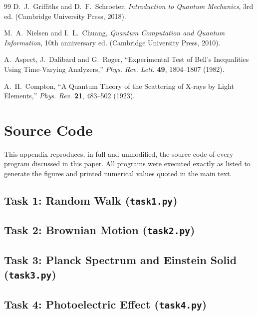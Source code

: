 \documentclass[11pt]{article}
\begin{document}
\begin{thebibliography}{99}
 D.~J.~Griffiths and D.~F.~Schroeter, \emph{Introduction to Quantum Mechanics}, 3rd ed. (Cambridge University Press, 2018).

 M.~A.~Nielsen and I.~L.~Chuang, \emph{Quantum Computation and Quantum Information}, 10th anniversary ed. (Cambridge University Press, 2010).

 A.~Aspect, J.~Dalibard and G.~Roger, ``Experimental Test of Bell's Inequalities Using Time-Varying Analyzers,'' \emph{Phys. Rev. Lett.} \textbf{49}, 1804--1807 (1982).

 A.~H.~Compton, ``A Quantum Theory of the Scattering of X-rays by Light Elements,'' \emph{Phys. Rev.} \textbf{21}, 483--502 (1923).

\end{thebibliography}

\appendix
\section{Source Code}
\label{sec:appendix}

This appendix reproduces, in full and unmodified, the source code of every program discussed in this paper. All programs were executed exactly as listed to generate the figures and printed numerical values quoted in the main text.

\subsection{Task 1: Random Walk (\texttt{task1.py})}


\subsection{Task 2: Brownian Motion (\texttt{task2.py})}


\subsection{Task 3: Planck Spectrum and Einstein Solid (\texttt{task3.py})}


\subsection{Task 4: Photoelectric Effect (\texttt{task4.py})}

\end{document}
